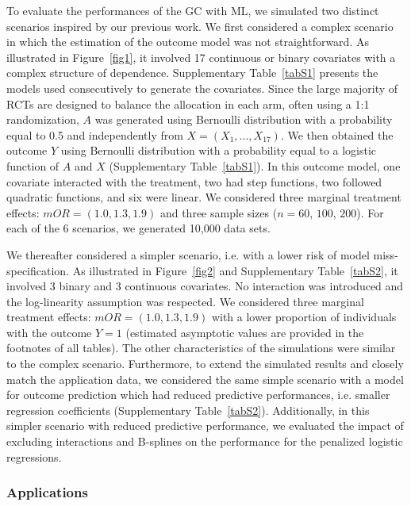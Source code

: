 \documentclass{article}
\begin{document}
To evaluate the performances of the GC with ML,  we simulated two distinct scenarios inspired by our previous work.\cite{le_borgne_g-computation_2021} We first considered a complex scenario in which the estimation of the outcome model was not straightforward.  As illustrated in Figure~\ref{fig1},  it  involved 17 continuous or binary covariates with a complex structure of dependence.  Supplementary Table~\ref{tabS1}  presents the models used consecutively to generate the covariates.    Since the large majority of RCTs are designed to balance the allocation in each arm, often using a 1:1 randomization, $A$ was generated using Bernoulli distribution  with a probability equal to 0.5 and independently from $X=(X_1, ...,X_{17})$.   We then obtained the outcome $Y$ using Bernoulli distribution with a probability  equal to a logistic function of $A$ and $X$ (Supplementary Table~\ref{tabS1}).   In this outcome model,  one covariate interacted with the treatment,  two had step functions,  two followed quadratic functions,  and six were linear.   We considered three marginal treatment effects: $mOR = (1.0,  1.3, 1.9)$ and three sample sizes ($n = 60$,  $100$, $200$). For each of the 6 scenarios,  we generated 10,000 data sets. \cite{chatton_g-computation_2020} 



We thereafter considered a simpler scenario,  i.e.  with a lower risk of model miss-specification.  As illustrated in Figure~\ref{fig2} and Supplementary Table~\ref{tabS2},    it  involved 3 binary and 3 continuous covariates.  No interaction was introduced and the log-linearity  assumption was respected. We considered three marginal treatment effects: $mOR = (1.0, 1.3, 1.9)$ with a lower proportion of individuals with the outcome $Y=1$ (estimated asymptotic values are provided in the footnotes of all tables). The other characteristics of the simulations were similar to the complex scenario. Furthermore, to extend the simulated results and closely match the application data, we considered the same simple scenario with a model for outcome prediction which had reduced predictive performances, i.e. smaller regression coefficients (Supplementary Table~\ref{tabS2}). Additionally, in this simpler scenario with reduced predictive performance, we evaluated the impact of excluding interactions and B-splines on the performance for the penalized logistic regressions.



\subsubsection{Applications}
\end{document}
